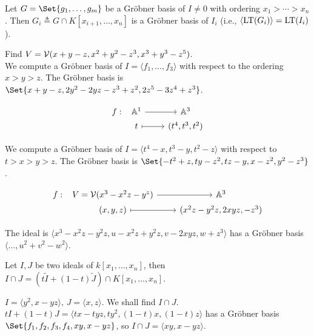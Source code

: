 \begin{theorem}
  Let $G = \Set{g_1, \dots, g_m}$ be a Gr\"obner basis of $I \neq 0$ with ordering
  $x_1 > \dotsm > x_n$. Then $G_i \triangleq G \cap K[x_{i+1}, \dots, x_n]$
  is a Gr\"obner basis of $I_i$ (i.e., $\langle \operatorname{LT}(G_i) \rangle = \operatorname{LT}(I_i)$).
\end{theorem}

\begin{example}
  Find $V = \mathcal{V}(x+y-z, x^2+y^2-z^3, x^3+y^3-z^5)$. \\
  We compute a Gr\"obner basis of $I = \langle f_1, \dots, f_3 \rangle$ with respect to the ordering $x > y > z$.
  The Gr\"obner basis is $\Set{x+y-z, 2y^2-2yz-z^3+z^2, 2z^5-3z^4+z^3}$.
\end{example}

\begin{example}
  \[
    \begin{tikzcd}[column sep=0.8cm,row sep=0ex]
      f: &[-0.7cm] \mathbb{A}^1 \arrow[r] & \mathbb{A}^3 \\
      & t \arrow[r, mapsto] & (t^4, t^3, t^2)
    \end{tikzcd}
  \]

  We compute a Gr\"obner basis of $I = \langle t^4 - x, t^3 - y, t^2 - z \rangle$ with respect to
  $t > x > y > z$. The Gr\"obner basis is $\Set{-t^2+z, ty-z^2, tz-y, x-z^2, y^2-z^3}$.
\end{example}

\begin{example}
  \[
    \begin{tikzcd}[column sep=0.8cm,row sep=0ex]
      f: &[-0.7cm] V = \Vc(x^3 - x^2z - y^z) \arrow[r] & \mathbb{A}^3 \\
      & (x, y, z) \arrow[r, mapsto] & (x^2 z - y^2 z, 2xyz, -z^3)
    \end{tikzcd}
  \]

  The ideal is $\langle x^3 - x^2 z - y^2 z, u - x^2 z + y^2 z, v - 2 x y z, w + z^3 \rangle$
  has a Gr\"obner basis $\langle \dots, u^2 + v^2 - w^2 \rangle$.
\end{example}

\begin{theorem}
  Let $I, J$ be two ideals of $k[x_1, \dots, x_n]$, then $I \cap J = (t \tilde{I} + (1 - t) \tilde{J}) \cap K[x_1, \dots, x_n]$.
\end{theorem}

\begin{example}
  $I = \langle y^2 , x - yz \rangle, \, J = \langle x, z \rangle$. We shall find $I \cap J$. \\
  $tI + (1-t)J = \langle tx - tyz, ty^2, (1-t)x, (1-t)z \rangle$ has a Gr\"obner basis
  $\Set{f_1, f_2, f_3, f_4, xy, x - yz}$, so $I \cap J = \langle xy, x-yz \rangle$.
\end{example}

